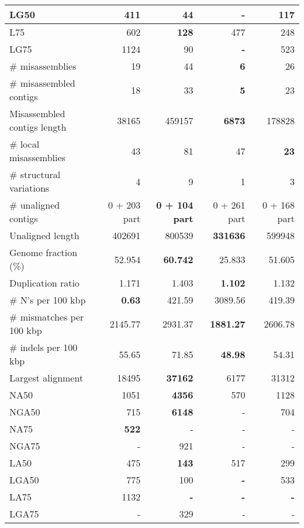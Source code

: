 \documentclass[12pt,a4paper]{article}
\begin{document}
\begin{table}[ht]
\begin{center}
\begin{tabular}{|l*{4}{|r}|}
LG50 & 411 & 44 & {\bf -} & 117 \\ \hline
L75 & 602 & {\bf 128} & 477 & 248 \\ \hline
LG75 & 1124 & 90 & {\bf -} & 523 \\ \hline
\# misassemblies & 19 & 44 & {\bf 6} & 26 \\ \hline
\# misassembled contigs & 18 & 33 & {\bf 5} & 23 \\ \hline
Misassembled contigs length & 38165 & 459157 & {\bf 6873} & 178828 \\ \hline
\# local misassemblies & 43 & 81 & 47 & {\bf 23} \\ \hline
\# structural variations & 4 & 9 & 1 & 3 \\ \hline
\# unaligned contigs & 0 + 203 part & {\bf 0 + 104 part} & 0 + 261 part & 0 + 168 part \\ \hline
Unaligned length & 402691 & 800539 & {\bf 331636} & 599948 \\ \hline
Genome fraction (\%) & 52.954 & {\bf 60.742} & 25.833 & 51.605 \\ \hline
Duplication ratio & 1.171 & 1.403 & {\bf 1.102} & 1.132 \\ \hline
\# N's per 100 kbp & {\bf 0.63} & 421.59 & 3089.56 & 419.39 \\ \hline
\# mismatches per 100 kbp & 2145.77 & 2931.37 & {\bf 1881.27} & 2606.78 \\ \hline
\# indels per 100 kbp & 55.65 & 71.85 & {\bf 48.98} & 54.31 \\ \hline
Largest alignment & 18495 & {\bf 37162} & 6177 & 31312 \\ \hline
NA50 & 1051 & {\bf 4356} & 570 & 1128 \\ \hline
NGA50 & 715 & {\bf 6148} & - & 704 \\ \hline
NA75 & {\bf 522} & - & - & - \\ \hline
NGA75 & - & 921 & - & - \\ \hline
LA50 & 475 & {\bf 143} & 517 & 299 \\ \hline
LGA50 & 775 & 100 & {\bf -} & 533 \\ \hline
LA75 & 1132 & {\bf -} & {\bf -} & {\bf -} \\ \hline
LGA75 & - & 329 & - & - \\ \hline
\end{tabular}
\end{center}
\end{table}
\end{document}
